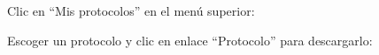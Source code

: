 \documentclass[12pt, spanish]{article}
\begin{document}
    \begin{steps}

        \item Clic en ``Mis protocolos'' en el menú superior:

            \medskip
            \begin{minipage}[t]{\linewidth}
            \raggedright
        \end{minipage}

        \item Escoger un protocolo y clic en enlace ``Protocolo'' para descargarlo:

            \medskip
            \begin{minipage}[t]{\linewidth}
            \raggedright
        \end{minipage}


\end{steps}
\end{document}
